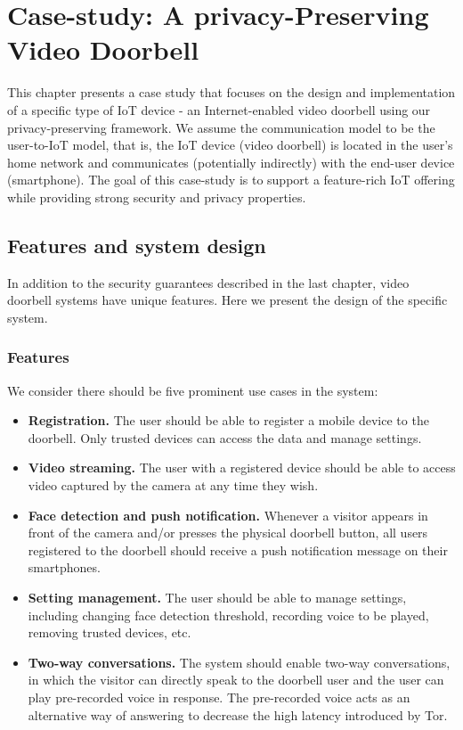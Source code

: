 \chapter{Case-study: A privacy-Preserving Video Doorbell}

This chapter presents a case study that focuses on the design and implementation of a specific type of IoT device - an Internet-enabled video doorbell using our privacy-preserving framework. We assume the communication model to be the user-to-IoT model, that is,  the IoT device (video doorbell) is located in the user’s home network and communicates (potentially indirectly) with the end-user device (smartphone). The goal of this case-study is to support a feature-rich IoT offering while providing strong security and privacy properties.

\section{Features and system design}
In addition to the security guarantees described in the last chapter, video doorbell systems have unique features. Here we present the design of the specific system.

\subsection{Features}
We consider there should be five prominent use cases in the system:
\begin{itemize}
	\item \textbf{Registration.} The user should be able to register a mobile device to the doorbell. Only trusted devices can access the data and manage settings.
	\item \textbf{Video streaming.} The user with a registered device should be able to access video captured by the camera at any time they wish.
	\item \textbf{Face detection and push notification.} Whenever a visitor appears in front of the camera and/or presses the physical doorbell button, all users registered to the doorbell should receive a push notification message on their smartphones.
	\item \textbf{Setting management.} The user should be able to manage settings, including changing face detection threshold, recording voice to be played, removing trusted devices, etc.
	\item \textbf{Two-way conversations.} The system should enable two-way conversations, in which the visitor can directly speak to the doorbell user and the user can play pre-recorded voice in response. The pre-recorded voice acts as an alternative way of answering to decrease the high latency introduced by Tor.
\end{itemize}

